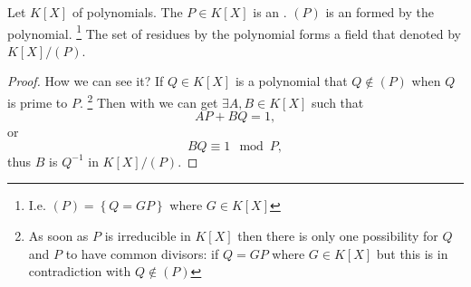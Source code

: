 \begin{claim}
\label{claim:lec1_sec14}
Let $K\left[X\right]$  of polynomials.
The $P \in K\left[X\right]$ is an
. $\left(P\right)$ is an 
 formed by the polynomial.
\footnote{
  I.e.
  \(
  \left(P\right) = \left\{ Q = G P \right\} 
  \)
  where $G \in K\left[X\right]$
}
The set of residues by
the polynomial forms a field that denoted by
$K\left[X\right]/\left(P\right)$.
\begin{proof}
How we can see it?
If $Q \in K\left[X\right]$ is a polynomial that $Q \notin
\left(P\right)$ when $Q$ is prime to $P$.
\footnote{
  As soon as $P$ is irreducible in $K\left[X\right]$ then there is only
  one possibility for $Q$ and $P$ to have common divisors: if $Q = G P$
  where $G \in K\left[X\right]$ but this is in contradiction with
  $Q \notin \left(P\right)$
}
Then with
 we can get $\exists A, B \in K\left[X\right]$
such that
\[
A P + B Q = 1,
\]
or
\[
B Q \equiv 1 \mod P,
\]
thus $B$ is $Q^{-1}$ in $K\left[X\right]/\left(P\right)$.
\end{proof}
\end{claim}

